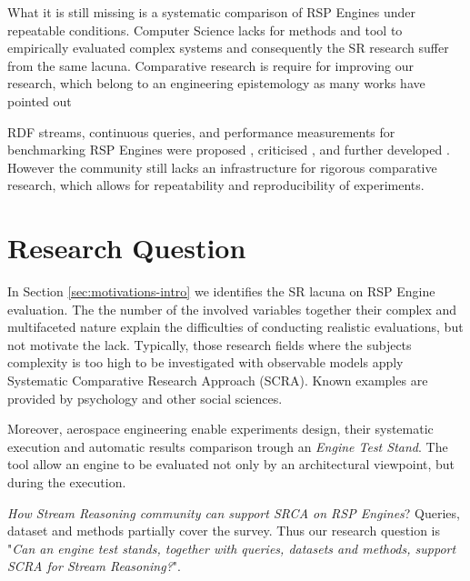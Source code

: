 What it is still missing is a systematic comparison of RSP Engines under repeatable conditions. Computer Science lacks for methods and tool to empirically evaluated complex systems \cite{Perry:2000:ESS:336512.336586} and consequently the SR research suffer from the same lacuna. Comparative research is require for improving our research, which belong to an engineering epistemology as many works have pointed out \cite{Tichy:1995:EEC:209090.209093,Wainer:2009:EEC:1518331.1518552}

RDF streams, continuous queries, and performance measurements for benchmarking RSP Engines were proposed \cite{LePhuoc2012c,Zhang2012}, criticised \cite{DBLP:conf/esws/ScharrenbachUMVB13}, and further developed \cite{DBLP:conf/semweb/DellAglioCBCV13}. However the community still lacks an infrastructure for rigorous comparative research, which allows for repeatability and reproducibility of experiments.


\section{Research Question}\label{sec:research-question-intro}

In Section \ref{sec:motivations-intro} we identifies the SR lacuna on RSP Engine evaluation. The the number of the involved variables together their complex and multifaceted nature explain the difficulties of conducting realistic evaluations, but not motivate the lack. Typically, those research fields where the subjects complexity is too high to be investigated with observable models apply Systematic Comparative Research Approach (SCRA). Known examples are provided by psychology and other social sciences.

Moreover, aerospace engineering enable experiments design, their systematic execution and automatic results comparison trough an \textit{Engine Test Stand}. The tool allow an engine to be evaluated not only by an architectural viewpoint, but during the execution.

\textit{How Stream Reasoning community can support SRCA on RSP Engines}? Queries, dataset and methods partially cover the survey. Thus our research question is "\textit{Can an engine test stands, together with queries, datasets and methods, support SCRA for Stream Reasoning?}".

